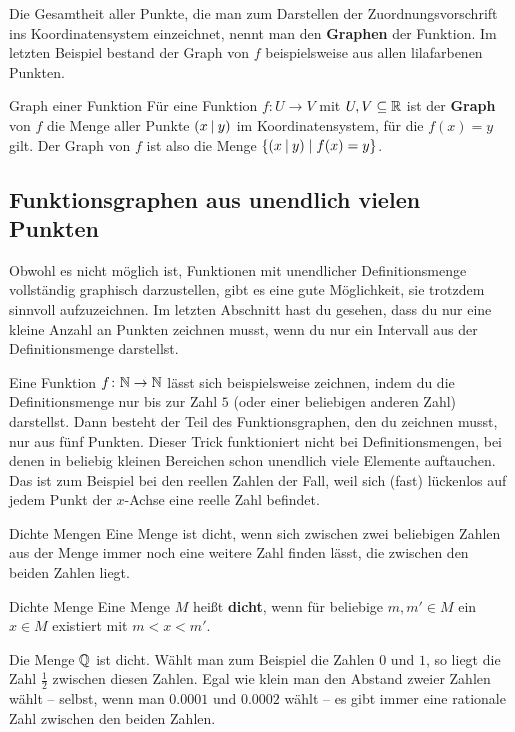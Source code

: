\documentclass[../../main.tex]{subfiles}
\begin{document}
Die Gesamtheit aller Punkte, die man zum Darstellen der Zuordnungsvorschrift ins Koordinatensystem einzeichnet, nennt man den \textbf{Graphen} der Funktion. Im letzten Beispiel bestand der Graph von $f$ beispielsweise aus allen lilafarbenen Punkten.

\begin{definition}{Graph einer Funktion}
        Für eine Funktion $f\colon U\rightarrow V$ mit $U,V\subseteq \mathbb{R}$ ist der \textbf{Graph} von $f$ die Menge aller Punkte $\left(x \:\middle|\: y\right)$ im Koordinatensystem, für die $f(x)=y$ gilt. Der Graph von $f$ ist also die Menge $\{\left(x \:\middle|\: y\right) \mid f(x)=y\}$.
\end{definition}

\subsection{Funktionsgraphen aus unendlich vielen Punkten}
\label{sec:abbildungen_graphen_stetig}

Obwohl es nicht möglich ist, Funktionen mit unendlicher Definitionsmenge vollständig graphisch darzustellen, gibt es eine gute Möglichkeit, sie trotzdem sinnvoll aufzuzeichnen. Im letzten Abschnitt hast du gesehen, dass du nur eine kleine Anzahl an Punkten zeichnen musst, wenn du nur ein Intervall aus der Definitionsmenge darstellst.

Eine Funktion $f\colon\mathbb{N}\rightarrow\mathbb{N}$ lässt sich beispielsweise zeichnen, indem du die Definitionsmenge nur bis zur Zahl $5$ (oder einer beliebigen anderen Zahl) darstellst. Dann besteht der Teil des Funktionsgraphen, den du zeichnen musst, nur aus fünf Punkten. Dieser Trick funktioniert nicht bei Definitionsmengen, bei denen in beliebig kleinen Bereichen schon unendlich viele Elemente auftauchen. Das ist zum Beispiel bei den reellen Zahlen der Fall, weil sich (fast) lückenlos auf jedem Punkt der $x$-Achse eine reelle Zahl befindet.

\begin{advanced}{Dichte Mengen}
    Eine Menge ist dicht, wenn sich zwischen zwei beliebigen Zahlen aus der Menge immer noch eine weitere Zahl finden lässt, die zwischen den beiden Zahlen liegt.
    
    \begin{definition}{Dichte Menge}
        Eine Menge $M$ heißt \textbf{dicht}, wenn für beliebige $m,m'\in M$ ein $x\in M$ existiert mit $m<x<m'$.
    \end{definition}
    
    \begin{advexample}{}
        Die Menge $\mathbb{Q}$ ist dicht. Wählt man zum Beispiel die Zahlen $0$ und $1$, so liegt die Zahl $\frac{1}{2}$ zwischen diesen Zahlen. Egal wie klein man den Abstand zweier Zahlen wählt -- selbst, wenn man $0.0001$ und $0.0002$ wählt -- es gibt immer eine rationale Zahl zwischen den beiden Zahlen.
    \end{advexample}
\end{advanced}
\fi
\end{document}
